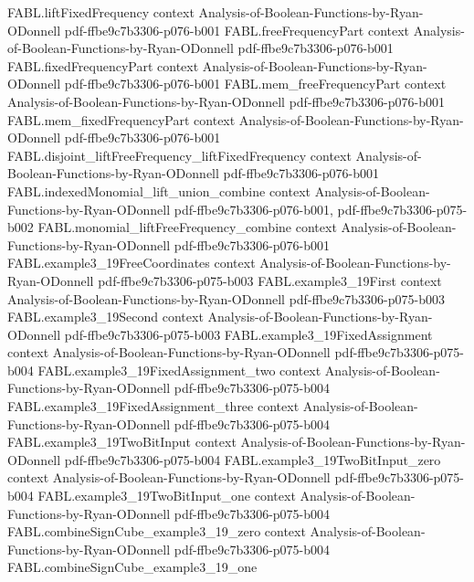 \begin{theorem}
\proofstep
  {FABL.liftFixedFrequency}
  {context}
  {Analysis-of-Boolean-Functions-by-Ryan-ODonnell}
  {pdf-ffbe9c7b3306-p076-b001}
\proofstep
  {FABL.freeFrequencyPart}
  {context}
  {Analysis-of-Boolean-Functions-by-Ryan-ODonnell}
  {pdf-ffbe9c7b3306-p076-b001}
\proofstep
  {FABL.fixedFrequencyPart}
  {context}
  {Analysis-of-Boolean-Functions-by-Ryan-ODonnell}
  {pdf-ffbe9c7b3306-p076-b001}
\proofstep
  {FABL.mem_freeFrequencyPart}
  {context}
  {Analysis-of-Boolean-Functions-by-Ryan-ODonnell}
  {pdf-ffbe9c7b3306-p076-b001}
\proofstep
  {FABL.mem_fixedFrequencyPart}
  {context}
  {Analysis-of-Boolean-Functions-by-Ryan-ODonnell}
  {pdf-ffbe9c7b3306-p076-b001}
\proofstep
  {FABL.disjoint_liftFreeFrequency_liftFixedFrequency}
  {context}
  {Analysis-of-Boolean-Functions-by-Ryan-ODonnell}
  {pdf-ffbe9c7b3306-p076-b001}
\proofstep
  {FABL.indexedMonomial_lift_union_combine}
  {context}
  {Analysis-of-Boolean-Functions-by-Ryan-ODonnell}
  {pdf-ffbe9c7b3306-p076-b001,
    pdf-ffbe9c7b3306-p075-b002}
\proofstep
  {FABL.monomial_liftFreeFrequency_combine}
  {context}
  {Analysis-of-Boolean-Functions-by-Ryan-ODonnell}
  {pdf-ffbe9c7b3306-p076-b001}
\proofstep
  {FABL.example3_19FreeCoordinates}
  {context}
  {Analysis-of-Boolean-Functions-by-Ryan-ODonnell}
  {pdf-ffbe9c7b3306-p075-b003}
\proofstep
  {FABL.example3_19First}
  {context}
  {Analysis-of-Boolean-Functions-by-Ryan-ODonnell}
  {pdf-ffbe9c7b3306-p075-b003}
\proofstep
  {FABL.example3_19Second}
  {context}
  {Analysis-of-Boolean-Functions-by-Ryan-ODonnell}
  {pdf-ffbe9c7b3306-p075-b003}
\proofstep
  {FABL.example3_19FixedAssignment}
  {context}
  {Analysis-of-Boolean-Functions-by-Ryan-ODonnell}
  {pdf-ffbe9c7b3306-p075-b004}
\proofstep
  {FABL.example3_19FixedAssignment_two}
  {context}
  {Analysis-of-Boolean-Functions-by-Ryan-ODonnell}
  {pdf-ffbe9c7b3306-p075-b004}
\proofstep
  {FABL.example3_19FixedAssignment_three}
  {context}
  {Analysis-of-Boolean-Functions-by-Ryan-ODonnell}
  {pdf-ffbe9c7b3306-p075-b004}
\proofstep
  {FABL.example3_19TwoBitInput}
  {context}
  {Analysis-of-Boolean-Functions-by-Ryan-ODonnell}
  {pdf-ffbe9c7b3306-p075-b004}
\proofstep
  {FABL.example3_19TwoBitInput_zero}
  {context}
  {Analysis-of-Boolean-Functions-by-Ryan-ODonnell}
  {pdf-ffbe9c7b3306-p075-b004}
\proofstep
  {FABL.example3_19TwoBitInput_one}
  {context}
  {Analysis-of-Boolean-Functions-by-Ryan-ODonnell}
  {pdf-ffbe9c7b3306-p075-b004}
\proofstep
  {FABL.combineSignCube_example3_19_zero}
  {context}
  {Analysis-of-Boolean-Functions-by-Ryan-ODonnell}
  {pdf-ffbe9c7b3306-p075-b004}
\proofstep
  {FABL.combineSignCube_example3_19_one}

\end{theorem}

